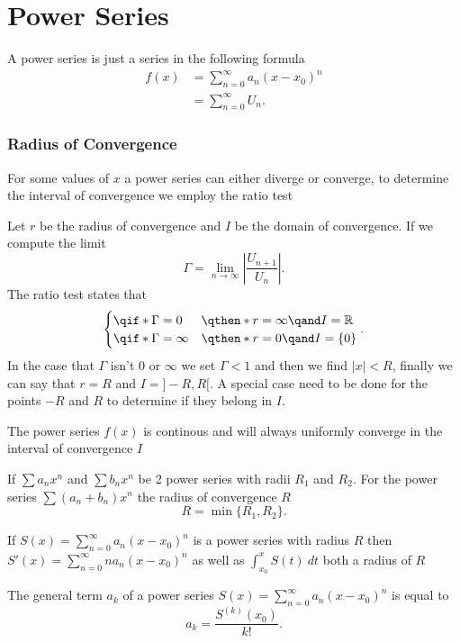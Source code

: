 \part{Power Series}

A power series is just a series in the following formula
\begin{align*}
	f(x) & =\sum_{n=0}^{\infty} a_n(x-x_0)^n \\
	     & =\sum_{n=0}^{\infty} U_n
	.\end{align*}

\section{Radius of Convergence}

For some values of $x$ a power series can either diverge or converge, to determine the interval of convergence we employ the ratio test

\begin{theorem}
	Let $r$ be the radius of convergence and $I$ be the domain of convergence. If we compute the limit
	\[
		\Gamma = \lim_{n \to \infty}\left| \frac{U_{n+1}}{U_n} \right|
		.\]
	The ratio test states that
	\[
		\begin{cases}
			\qif* \Gamma = 0      & \qthen* r=\infty\qand I=\mathbb{R} \\
			\qif* \Gamma = \infty & \qthen* r=0\qand I=\{0\}           \\
		\end{cases}
		.\]
	In the case that $\Gamma$ isn't 0 or $\infty$ we set $\Gamma<1$ and then we find $|x|<R$, finally we can say that $r=R$ and $I=]-R,R[$. A special case need to be done for the points  $-R$ and $R$ to determine if they belong in  $I$.
\end{theorem}

\begin{remark}
	The power series $f(x)$ is continous and will always uniformly converge in the interval of convergence $I$
\end{remark}

\begin{theorem}

	If $\sum a_n x^n$ and $\sum b_n x^n$ be 2 power series with radii  $R_1$ and $R_2$. For the power series $\sum (a_n+b_n)x^n$ the radius of convergence $R$
	\[
		R=\min \{R_1,R_2\}
		.\]
\end{theorem}


\begin{theorem}
	If $S(x)=\sum_{n=0}^{\infty} a_n(x-x_0)^n$ is a power series with radius $R$ then $S'(x)=\sum_{n=0}^{\infty} na_n(x-x_0)^n$ as well as $\int_{{x_0}}^{{x}} {S(t)} \: d{t}$ both a radius of $R$
\end{theorem}

The general term $a_k$ of a power series $S(x)=\sum_{n=0}^{\infty} a_n(x-x_0)^n$ is equal to
\[
	a_k = \frac{S^{(k)}(x_0)}{k!}
	.\]
